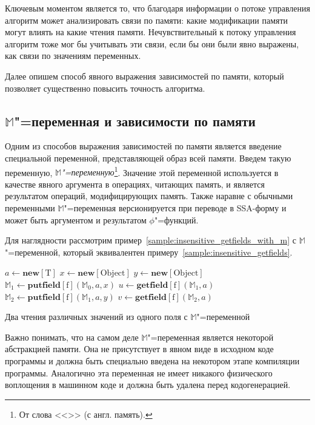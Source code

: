 \documentclass[14pt,titlepage,draft]{extarticle}
\newcommand{\M}{\ensuremath{\mathbb{M}}}
\let\mathphi\phi
\renewcommand{\phi}{\ensuremath{\mathphi}}
\newcommand{\type}[1]{\mathrm{#1}}
\newcommand{\field}[1]{\mathrm{#1}}
\newcommand{\op}[1]{\mathbf{#1}}
\begin{document}
    Ключевым моментом является то, что благодаря информации о потоке
    управления алгоритм может анализировать связи по памяти: какие модификации
    памяти могут влиять на какие чтения памяти. Нечувствительный к потоку
    управления алгоритм тоже мог бы учитывать эти связи, если бы они были явно
    выражены, как связи по значениям переменных.

    Далее опишем способ явного выражения зависимостей по памяти, который
    позволяет существенно повысить точность алгоритма.

  \subsection{\texorpdfstring{\M}{M}"=переменная и зависимости по памяти}

    Одним из способов выражения зависимостей по памяти является введение
    специальной переменной, представляющей образ всей памяти.
    Введем такую переменную, \emph{\M"=переменную}\footnote{
      От слова <<>> (с англ. память).
    }.
    Значение этой переменной используется в качестве явного аргумента в
    операциях, читающих память, и является результатом операций, модифицирующих
    память. Также наравне с обычными переменными \M"=переменная версионируется
    при переводе в SSA-форму и может быть аргументом и результатом
    \phi"=функций.

    Для наглядности рассмотрим
    пример~\ref{sample:insensitive_getfields_with_m} с \M"=переменной, который
    эквивалентен примеру~\ref{sample:insensitive_getfields}.

    \begin{sample}
      \begin{algorithmic}[1]
        \State $a \gets \op{new}[\type{T}]$
        \State $x \gets \op{new}[\type{Object}]$
        \State $y \gets \op{new}[\type{Object}]$
        \State $\M_1 \gets \op{putfield}[\field{f}](\M_0, a, x)$
        \State $u \gets \op{getfield}[\field{f}](\M_1, a)$
        \State $\M_2 \gets \op{putfield}[\field{f}](\M_1, a, y)$
        \State $v \gets \op{getfield}[\field{f}](\M_2, a)$
      \end{algorithmic}
      \caption{Два чтения различных значений из одного поля с \M"=переменной}
      \label{sample:insensitive_getfields_with_m}
    \end{sample}

    Важно понимать, что на самом деле \M"=переменная является некоторой
    абстракцией памяти. Она не присутствует в явном виде в исходном коде
    программы и должна быть специально введена на некотором этапе компиляции
    программы. Аналогично эта переменная не имеет никакого физического
    воплощения в машинном коде и должна быть удалена перед кодогенерацией.
\end{document}
